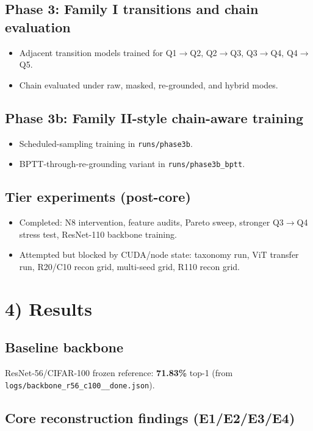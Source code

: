 \documentclass[11pt]{article}
\begin{document}
\subsection{Phase 3: Family I transitions and chain evaluation}
\begin{itemize}[leftmargin=*]
    \item Adjacent transition models trained for Q1$\rightarrow$Q2, Q2$\rightarrow$Q3, Q3$\rightarrow$Q4, Q4$\rightarrow$Q5.
    \item Chain evaluated under raw, masked, re-grounded, and hybrid modes.
\end{itemize}

\subsection{Phase 3b: Family II-style chain-aware training}
\begin{itemize}[leftmargin=*]
    \item Scheduled-sampling training in \texttt{runs/phase3b}.
    \item BPTT-through-re-grounding variant in \texttt{runs/phase3b\_bptt}.
\end{itemize}

\subsection{Tier experiments (post-core)}
\begin{itemize}[leftmargin=*]
    \item Completed: N8 intervention, feature audits, Pareto sweep, stronger Q3$\rightarrow$Q4 stress test, ResNet-110 backbone training.
    \item Attempted but blocked by CUDA/node state: taxonomy run, ViT transfer run, R20/C10 recon grid, multi-seed grid, R110 recon grid.
\end{itemize}

\section{4) Results}
\subsection{Baseline backbone}
ResNet-56/CIFAR-100 frozen reference: \textbf{71.83\%} top-1 (from \texttt{logs/backbone\_r56\_c100\_\_done.json}).

\subsection{Core reconstruction findings (E1/E2/E3/E4)}
\end{document}
